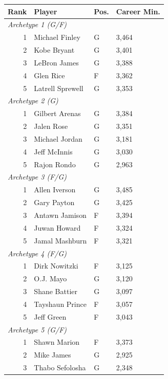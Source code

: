 \begin{table}[htbp]
  \centering\small
  \begin{tabular}{rlll}
    \toprule
    Rank & Player & Pos. & Career Min. \\
    \midrule
    \multicolumn{4}{l}{\textit{Archetype 1 (G/F)}} \\
    \midrule
    1 & Michael Finley & G & 3,464 \\
    2 & Kobe Bryant & G & 3,401 \\
    3 & LeBron James & G & 3,388 \\
    4 & Glen Rice & F & 3,362 \\
    5 & Latrell Sprewell & G & 3,353 \\
    \midrule[0.4pt]
    \multicolumn{4}{l}{\textit{Archetype 2 (G)}} \\
    \midrule
    1 & Gilbert Arenas & G & 3,384 \\
    2 & Jalen Rose & G & 3,351 \\
    3 & Michael Jordan & G & 3,181 \\
    4 & Jeff McInnis & G & 3,030 \\
    5 & Rajon Rondo & G & 2,963 \\
    \midrule[0.4pt]
    \multicolumn{4}{l}{\textit{Archetype 3 (F/G)}} \\
    \midrule
    1 & Allen Iverson & G & 3,485 \\
    2 & Gary Payton & G & 3,425 \\
    3 & Antawn Jamison & F & 3,394 \\
    4 & Juwan Howard & F & 3,324 \\
    5 & Jamal Mashburn & F & 3,321 \\
    \midrule[0.4pt]
    \multicolumn{4}{l}{\textit{Archetype 4 (F/G)}} \\
    \midrule
    1 & Dirk Nowitzki & F & 3,125 \\
    2 & O.J. Mayo & G & 3,120 \\
    3 & Shane Battier & G & 3,097 \\
    4 & Tayshaun Prince & F & 3,057 \\
    5 & Jeff Green & F & 3,043 \\
    \midrule[0.4pt]
    \multicolumn{4}{l}{\textit{Archetype 5 (G/F)}} \\
    \midrule
    1 & Shawn Marion & F & 3,373 \\
    2 & Mike James & G & 2,925 \\
    3 & Thabo Sefolosha & G & 2,348 \\

\end{tabular}
\end{table}
